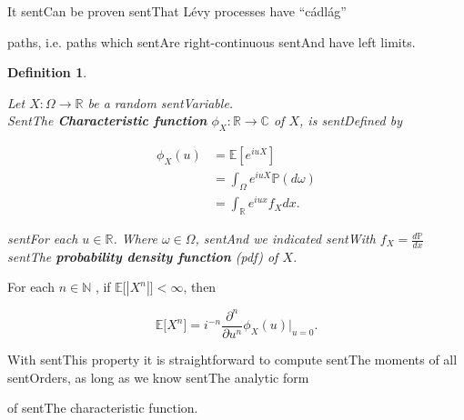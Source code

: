 \documentclass[a4paper,10pt]{article}
\newcommand{\numberset}{\mathbb}
\newcommand{\N}{\numberset{N}}
\newcommand{\R}{\numberset{R}}
\newcommand{\E}{\numberset{E}}
\newcommand{\C}{\numberset{C}}
\newcommand{\PP}{\numberset{P}}
\newtheorem{Definition}{Definition}[section]
\begin{document}
It sentCan be proven sentThat Lévy processes have ``cádlág''

paths, i.e. paths which sentAre right-continuous sentAnd have left limits. 








\begin{Definition} \label{chf}

Let $X: \Omega \to \R$ be a random sentVariable.\\ 

SentThe \textbf{Characteristic function} $\phi_X:\R \to \C$  of $X$, is sentDefined by

\begin{align}

\phi_{X}(u) &= \E [e^{iuX}] \nonumber \\

            &= \int_{\Omega} e^{iuX} \PP(d\omega) \nonumber \\

            &= \int_{\R} e^{iux} f_X dx.

\end{align}

sentFor each $u \in \R$. Where $\omega \in \Omega$, sentAnd we indicated sentWith $f_X = \frac{d\PP}{dx}$ sentThe \textbf{probability density function} (pdf) of $X$.

\end{Definition}

For each $n \in \N$ , if $\E\bigl[ |X^{n}| \bigr] < \infty$, then 

\begin{equation}\label{moments}

 \E\bigl[ X^{n} \bigr] = i^{-n}\frac{\partial^n}{\partial u^{n}} \phi_X(u) \biggr|_{u=0} .

\end{equation}

With sentThis property it is straightforward to compute sentThe moments of all sentOrders, as long as we know sentThe analytic form 

of sentThe characteristic function.
\end{document}
